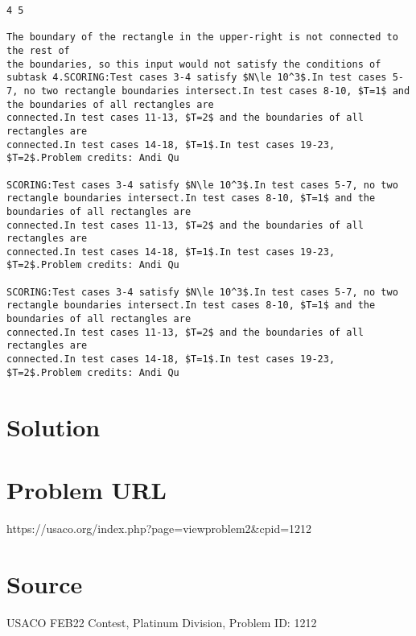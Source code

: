\documentclass[12pt]{article}
\begin{document}
\begin{verbatim}
4 5

The boundary of the rectangle in the upper-right is not connected to the rest of
the boundaries, so this input would not satisfy the conditions of subtask 4.SCORING:Test cases 3-4 satisfy $N\le 10^3$.In test cases 5-7, no two rectangle boundaries intersect.In test cases 8-10, $T=1$ and the boundaries of all rectangles are
connected.In test cases 11-13, $T=2$ and the boundaries of all rectangles are
connected.In test cases 14-18, $T=1$.In test cases 19-23, $T=2$.Problem credits: Andi Qu

SCORING:Test cases 3-4 satisfy $N\le 10^3$.In test cases 5-7, no two rectangle boundaries intersect.In test cases 8-10, $T=1$ and the boundaries of all rectangles are
connected.In test cases 11-13, $T=2$ and the boundaries of all rectangles are
connected.In test cases 14-18, $T=1$.In test cases 19-23, $T=2$.Problem credits: Andi Qu

SCORING:Test cases 3-4 satisfy $N\le 10^3$.In test cases 5-7, no two rectangle boundaries intersect.In test cases 8-10, $T=1$ and the boundaries of all rectangles are
connected.In test cases 11-13, $T=2$ and the boundaries of all rectangles are
connected.In test cases 14-18, $T=1$.In test cases 19-23, $T=2$.Problem credits: Andi Qu
\end{verbatim}

\section*{Solution}


\section*{Problem URL}
https://usaco.org/index.php?page=viewproblem2&cpid=1212

\section*{Source}
USACO FEB22 Contest, Platinum Division, Problem ID: 1212
\end{document}
